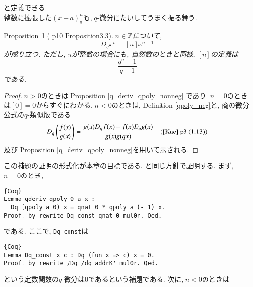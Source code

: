 \documentclass[11pt]{jarticle}
\theoremstyle{mystyle}
\newtheorem{prop}[df]{$\textrm{Proposition}$}
\newcommand{\bprop}{\begin{shadebox} \begin{prop}}
\newcommand{\eprop}{\end{prop} \end{shadebox}}
\newcommand{\bpf}{\begin{proof}}
\newcommand{\epf}{\end{proof}}
\newcommand{\Z}{\mathbb{Z}}
\newcommand{\0}{\textbf{0}}
\newcommand{\1}{\textbf{1}}
\newcommand{\2}{\textbf{2}}
\begin{document}
と定義できる. \\
整数に拡張した$(x - a)^n_q$も, $q$-微分にたいしてうまく振る舞う. 
\bprop[\cite{Kac} p10 Proposition3.3]
  $n \in \Z$について, 
  \[
    D_q x^n = [n] x ^{n - 1}
  \]
  が成り立つ. ただし, $n$が整数の場合にも, 自然数のときと同様, $[n]$の定義は
  \[
    \frac{q^n - 1}{q - 1}
  \]
  である. 
\eprop
\bpf
  $n > 0$のときは Proposition \ref{q_deriv_qpoly_nonneg} であり, $n = 0$のときは$[0] = 0$からすぐにわかる. 
  $n < 0$のときは, Definition \ref{qpoly_neg}と, 商の微分公式の$q$-類似版である
  \[
    D_q \left( \frac{f(x)}{g(x)} \right) = \frac{g(x) D_q f(x) - f(x) D_q g(x)}{g(x) g(qx)} \quad
    \text{(\cite{Kac} p3 (1.13))}
  \]
  及び Proposition \ref{q_deriv_qpoly_nonneg}を用いて示される. 
\epf
この補題の証明の形式化が本章の目標である. \cite{Kac}と同じ方針で証明する. まず, $n = 0$のとき, 
\begin{lstlisting}{Coq}
Lemma qderiv_qpoly_0 a x :
  Dq (qpoly a 0) x = qnat 0 * qpoly a (- 1) x.
Proof. by rewrite Dq_const qnat_0 mul0r. Qed.
\end{lstlisting}
である. ここで, {\tt Dq\_const}は
\begin{lstlisting}{Coq}
Lemma Dq_const x c : Dq (fun x => c) x = 0.
Proof. by rewrite /Dq /dq addrK' mul0r. Qed.
\end{lstlisting}
という定数関数の$q$-微分は$0$であるという補題である. 次に, $n < 0$のときは
\end{document}
